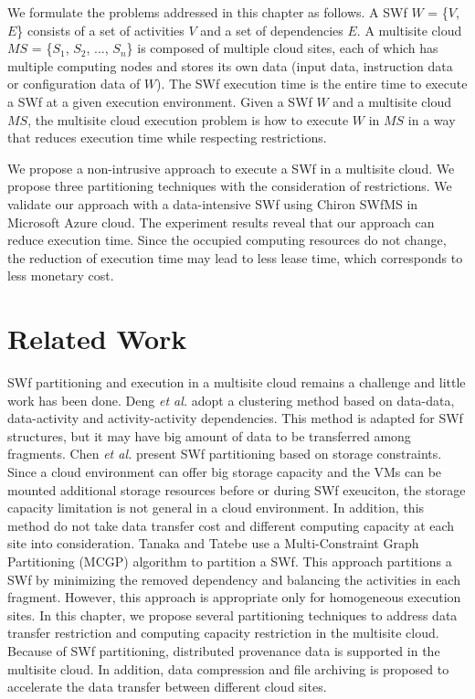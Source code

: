 We formulate the problems addressed in this chapter as follows. A SWf \textit{$W$} = \{\textit{$V$},\textit{$E$}\} consists of a set of activities \textit{$V$} and a set of dependencies \textit{$E$}. A multisite cloud \textit{$MS$} = \{\textit{$S_{1}$}, \textit{$S_{2}$}, ..., \textit{$S_{n}$}\} is composed of multiple cloud sites, each of which has multiple computing nodes and stores its own data (input data, instruction data or configuration data of \textit{$W$}).
The SWf execution time is the entire time to execute a SWf at a given execution environment.
Given a SWf \textit{$W$} and a multisite cloud \textit{$MS$}, the multisite cloud execution problem is how to execute \textit{$W$} in \textit{$MS$} in a way that
reduces execution time while respecting restrictions.

We propose a non-intrusive approach to execute a SWf in a multisite cloud. We propose three partitioning techniques with the consideration of restrictions. We validate our approach with a data-intensive SWf using Chiron \cite{Ogasawara2013} SWfMS in Microsoft Azure \cite{Azure} cloud.
The experiment results reveal that our approach can reduce execution time. Since the occupied computing resources do not change, the reduction of execution time may lead to less lease time, 
which corresponds to less monetary cost.

\section{Related Work}
\label{sec:SWEMCRW}
SWf partitioning and execution in a multisite cloud remains a challenge and little work has been done. Deng \textit{et al.} \cite{Deng2011} adopt a clustering method based on data-data, data-activity and activity-activity dependencies. This method is adapted for SWf structures, but it may have big amount of data to be transferred among fragments. Chen \textit{et al.} \cite{Chen2012} present SWf partitioning based on storage constraints. Since a cloud environment can offer big storage capacity and the VMs can be mounted additional storage resources before or during SWf exeuciton, the storage capacity limitation is not general in a cloud environment. 
In addition, this method do not take data transfer cost and different computing capacity at each site into consideration. Tanaka and Tatebe \cite{Tanaka2012} use a Multi-Constraint Graph Partitioning (MCGP) algorithm \cite{Karypis1998} to partition a SWf. This approach partitions a SWf by minimizing the removed dependency and balancing the activities in each fragment.
However, this approach is appropriate only for homogeneous execution sites.
In this chapter, we propose several partitioning techniques to address data transfer restriction and computing capacity restriction in the multisite cloud. Because of SWf partitioning, distributed provenance data is supported in the multisite cloud. In addition, data compression and file archiving is proposed to accelerate the data transfer between different cloud sites.


